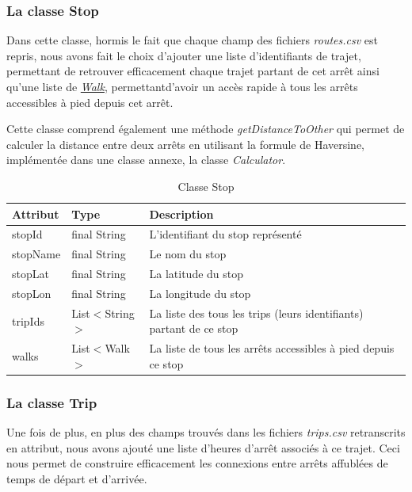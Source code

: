 \documentclass[12pt]{article}
\begin{document}
\subsubsection{La classe Stop}
Dans cette classe, hormis le fait que chaque champ des fichiers \emph{routes.csv} est repris, nous avons fait le choix d'ajouter
une liste d'identifiants de trajet, permettant de retrouver efficacement chaque trajet partant de cet arrêt ainsi qu'une liste de \hyperref[sec:walk]{\emph{Walk}}, permettantd'avoir un accès rapide à tous les arrêts accessibles à pied depuis cet arrêt.

Cette classe comprend également une méthode \emph{getDistanceToOther} qui permet de calculer la distance entre deux arrêts en utilisant la formule de Haversine,
implémentée dans une classe annexe, la classe \emph{Calculator}.

\begin{table}[h]
    \centering
    \begin{tabular}{|l|l|p{8cm}|}
    \hline
    \textbf{Attribut} & \textbf{Type} & \textbf{Description} \\
    \hline
    stopId & final String & L'identifiant du stop représenté \\
    stopName & final String & Le nom du stop \\
    stopLat & final String & La latitude du stop \\
    stopLon & final String & La longitude du stop \\
    tripIds & List$<$String$>$ & La liste des tous les trips (leurs identifiants) partant de ce stop \\
    walks & List$<$Walk$>$ & La liste de tous les arrêts accessibles à pied depuis ce stop \\
    \hline
    \end{tabular}
    \caption{Classe Stop}
\end{table}

\subsubsection{La classe Trip}
\label{sec:trip}
Une fois de plus, en plus des champs trouvés dans les fichiers \emph{trips.csv} retranscrits en attribut, nous avons ajouté
une liste d'heures d'arrêt associés à ce trajet. Ceci nous permet de construire efficacement les connexions entre arrêts affublées
de temps de départ et d'arrivée.
\end{document}
